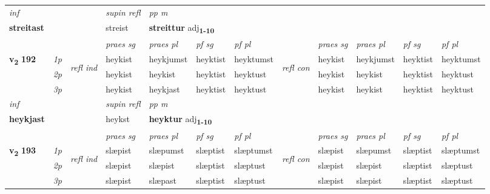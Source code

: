 \begin{longtable}[l]{X>{\footnotesize\itshape}llXXXXlXXXX}
   {\textit{inf}} & &       & \textit{supin refl} & \textit{pp m} \\*
  {\textbf{streitast}} & &       & streist & \multicolumn{2}{l}{\textbf{streittur} adj\textbf{\textsubscript{1-10}}} \\*

\midrule

 & &   & \textit{praes sg}  & \textit{praes pl}    & \textit{ pf sg} & \textit{pf pl} & & \textit{praes sg}  & \textit{praes pl}    & \textit{pf sg} & \textit{pf pl }  \\ \cmidrule{4-7} \cmidrule{9-12}
 \multirow{2}{*}{{{\textbf{v{\textsubscript{2}}} \Large{\textbf{192}}}}}  & 1p & \multirow{3}{*}{\begin{turn}{90}\textit{refl ind}\end{turn}}  & heykist & heykjumst & heyktist & heyktumst & \multirow{3}{*}{\begin{turn}{90}\textit{refl con}\end{turn}}  &heykist & heykjumst & heyktist & heyktumst \\*
 & 2p &  & heykist & heykist & heyktist & heyktust & &heykist & heykist & heyktist & heyktust \\*
 & 3p  & & heykist & heykjast & heyktist & heyktust & & heykist & heykist& heyktist & heyktust \\*
\cmidrule{4-7} \cmidrule{9-12}

   {\textit{inf}} & &       & \textit{supin refl} & \textit{pp m} \\*
  {\textbf{heykjast}} & &       & heykst & \multicolumn{2}{l}{\textbf{heyktur} adj\textbf{\textsubscript{1-10}}} \\*

\midrule

 & &   & \textit{praes sg}  & \textit{praes pl}    & \textit{ pf sg} & \textit{pf pl} & & \textit{praes sg}  & \textit{praes pl}    & \textit{pf sg} & \textit{pf pl }  \\ \cmidrule{4-7} \cmidrule{9-12}
 \multirow{2}{*}{{{\textbf{v{\textsubscript{2}}} \Large{\textbf{193}}}}}  & 1p & \multirow{3}{*}{\begin{turn}{90}\textit{refl ind}\end{turn}}  & slæpist & slæpumst & slæptist & slæptumst & \multirow{3}{*}{\begin{turn}{90}\textit{refl con}\end{turn}}  &slæpist & slæpumst & slæptist & slæptumst \\*
 & 2p &  & slæpist & slæpist & slæptist & slæptust & &slæpist & slæpist & slæptist & slæptust \\*
 & 3p  & & slæpist & slæpast & slæptist & slæptust & & slæpist & slæpist& slæptist & slæptust \\*
\cmidrule{4-7} \cmidrule{9-12}


\end{longtable}
